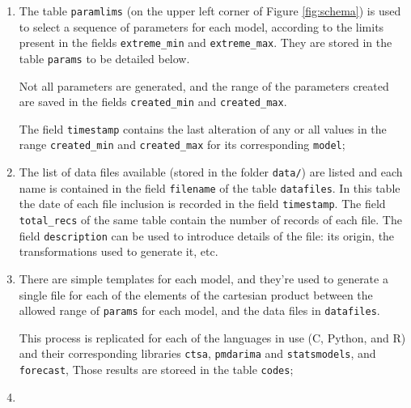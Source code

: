 \documentclass[a4paper,10pt]{article}
\begin{document}
\begin{enumerate}
    \item The table {\tt paramlims} (on the upper left corner of
        Figure \ref{fig:schema}) is used to select a sequence of
        parameters for each model, according to the limits present
        in the fields {\tt extreme\_min} and {\tt extreme\_max}.
        They are stored in the table {\tt params} to be detailed
        below.

        Not all parameters are generated, and the range of the
        parameters created are saved in the fields
        {\tt created\_min} and {\tt created\_max}.

        The field {\tt timestamp} contains the last alteration
        of any or all values in the range {\tt created\_min} and
        {\tt created\_max} for its corresponding {\tt model};

    \item The list of data files available (stored in the folder
        {\tt data/}) are listed and each name is contained in the
        field {\tt filename} of the table {\tt datafiles}. In this
        table the date of each file inclusion is recorded in the
        field {\tt timestamp}. The field {\tt total\_recs} of the
        same table contain the number of records of each file.
        The field {\tt description} can be used to introduce
        details of the file: its origin, the transformations used
        to generate it, etc.

    \item There are simple templates for each model, and they're
        used to generate a single file for each of the elements of
        the cartesian product between the allowed range of
        {\tt params} for each model, and the data files in
        {\tt datafiles}.

        This process is replicated for each of the languages in
        use (C, Python, and R) and their corresponding libraries
        {\tt ctsa}, {\tt pmdarima} and {\tt statsmodels}, and
        {\tt forecast}, Those results are storeed in the table
        {\tt codes};

    \item


\end{enumerate}
\end{document}
